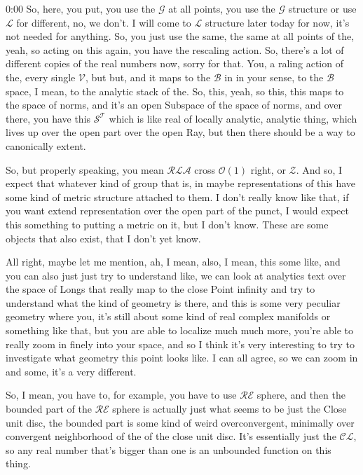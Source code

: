 \begin{unfinished}{0:00}
So, here, you put, you use the $\mathcal{G}$ at all points, you use the $\mathcal{G}$ structure or use $\mathcal{L}$ for different, no, we don't. I will come to $\mathcal{L}$ structure later today for now, it's not needed for anything. So, you just use the same, the same at all points of the, yeah, so acting on this again, you have the rescaling action. So, there's a lot of different copies of the real numbers now, sorry for that. You, a raling action of the, every single $\mathcal{V}$, but but, and it maps to the $\mathcal{B}$ in in your sense, to the $\mathcal{B}$ space, I mean, to the analytic stack of the. So, this, yeah, so this, this maps to the space of norms, and it's an open Subspace of the space of norms, and over there, you have this $\mathcal{S}^\mathcal{T}$ which is like real of locally analytic, analytic thing, which lives up over the open part over the open Ray, but then there should be a way to canonically extent.

So, but properly speaking, you mean $\mathcal{R}\mathcal{L}\mathcal{A}$ cross $\mathcal{O}(1)$ right, or $\mathcal{Z}$. And so, I expect that whatever kind of group that is, in maybe representations of this have some kind of metric structure attached to them. I don't really know like that, if you want extend representation over the open part of the punct, I would expect this something to putting a metric on it, but I don't know. These are some objects that also exist, that I don't yet know.

All right, maybe let me mention, ah, I mean, also, I mean, this some like, and you can also just just try to understand like, we can look at analytics text over the space of Longs that really map to the close Point infinity and try to understand what the kind of geometry is there, and this is some very peculiar geometry where you, it's still about some kind of real complex manifolds or something like that, but you are able to localize much much more, you're able to really zoom in finely into your space, and so I think it's very interesting to try to investigate what geometry this point looks like. I can all agree, so we can zoom in and some, it's a very different.

So, I mean, you have to, for example, you have to use $\mathcal{R}\mathcal{E}$ sphere, and then the bounded part of the $\mathcal{R}\mathcal{E}$ sphere is actually just what seems to be just the Close unit disc, the bounded part is some kind of weird overconvergent, minimally over convergent neighborhood of the of the close unit disc. It's essentially just the $\mathcal{C}\mathcal{L}$, so any real number that's bigger than one is an unbounded function on this thing.


\end{unfinished}
